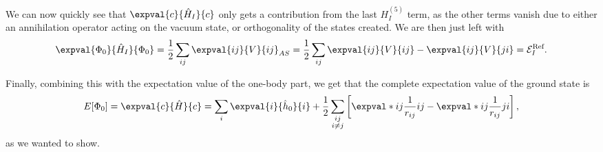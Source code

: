 We can now quickly see that $\expval{c}{\hat{H}_I}{c}$ only gets a contribution from the last $H_I^{(5)}$ term, as the other terms vanish due to either an annihilation operator acting on the vacuum state, or orthogonality of the states created.
We are then just left with
\begin{equation}
    \expval{\Phi_0}{\hat{H}_I}{\Phi_0} = \frac{1}{2} \sum_{ij} \expval{ij}{V}{ij}_{AS} = \frac{1}{2} \sum_{ij} \expval{ij}{V}{ij} - \expval{ij}{V}{ji} = \mathcal{E}_I^{\text{Ref}}.
\end{equation}

Finally, combining this with the expectation value of the one-body part, we get that the complete expectation value of the ground state is
\begin{equation}
    E[\Phi_0]
    = \expval{c}{\hat{H}}{c}
    = \sum_{i} \expval{i}{\hat{h}_0}{i} + \frac{1}{2} \sum_{\substack{ij \\ i \neq j}} \left[\expval*{ij}{\frac{1}{r_{ij}}}{ij} - \expval*{ij}{\frac{1}{r_{ij}}}{ji}\right],
\end{equation}
as we wanted to show.

